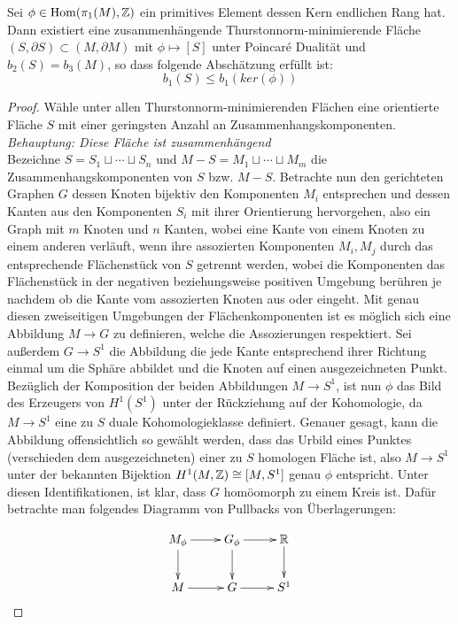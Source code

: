 \begin{lem}
	\label{lem:minS}
	Sei $\phi \in \operatorname{Hom} (\pi_1(M),\mathbb{Z})$ ein primitives Element dessen Kern endlichen Rang hat. Dann existiert eine zusammenhängende Thurstonnorm-minimierende Fläche $(S,\partial S) \subset (M,\partial M)$ mit $\phi \mapsto [S]$ unter Poincaré Dualität und $b_2(S)=b_3(M)$, so dass folgende Abschätzung erfüllt ist:
	\[
	b_1(S) \leq b_1(ker(\phi))
	\]
\end{lem}
\begin{proof}
	Wähle unter allen Thurstonnorm-minimierenden Flächen eine orientierte Fläche $S$ mit einer geringsten Anzahl an Zusammenhangskomponenten.\\
	\textit{Behauptung: Diese Fläche ist zusammenhängend}\\
	Bezeichne $S=S_1\sqcup \cdots \sqcup S_n$ und $M-S = M_1 \sqcup \cdots \sqcup M_m$ die Zusammenhangskomponenten von $S$ bzw. $M-S$. Betrachte nun den gerichteten Graphen $G$ dessen Knoten bijektiv den Komponenten $M_i$ entsprechen und dessen Kanten aus den Komponenten $S_i$ mit ihrer Orientierung hervorgehen, also ein Graph mit $m$ Knoten und $n$ Kanten, wobei eine Kante von einem Knoten zu einem anderen verläuft, wenn ihre assozierten Komponenten $M_i, M_j$ durch das entsprechende Flächenstück von $S$ getrennt werden, wobei die Komponenten das Flächenstück in der negativen beziehungsweise positiven Umgebung berühren je nachdem ob die Kante vom assozierten Knoten aus oder eingeht. Mit genau diesen zweiseitigen Umgebungen der Flächenkomponenten ist es möglich sich eine Abbildung $M \to G$ zu definieren, welche die Assozierungen respektiert. Sei außerdem $G \to S^1$ die Abbildung die jede Kante entsprechend ihrer Richtung einmal um die Sphäre abbildet und die Knoten auf einen ausgezeichneten Punkt. Bezüglich der Komposition der beiden Abbildungen $M \to S^1$, ist nun $\phi$ das Bild des Erzeugers von $H^1(S^1)$ unter der Rückziehung auf der Kohomologie, da $M \to S^1$ eine zu $S$ duale Kohomologieklasse definiert. Genauer gesagt, kann die Abbildung offensichtlich so gewählt werden, dass das Urbild eines Punktes (verschieden dem ausgezeichneten) einer zu $S$ homologen Fläche ist, also $M \to S^1$ unter der bekannten Bijektion $H^1(M,\mathbb{Z}) \cong [M,S^1]$ genau $\phi$ entspricht. Unter diesen Identifikationen, ist klar, dass $G$ homöomorph zu einem Kreis ist. Dafür betrachte man folgendes Diagramm von Pullbacks von Überlagerungen:

	\[
	 	\begin{xy}
	 		\xymatrix{
	 			M_\phi \ar[r] \ar[d] & G_\phi \ar[d] \ar[r] & \RR \ar[d]\\
	 			M \ar[r] & G \ar[r] &S^1
	 		}
	 	\end{xy}
	 \] 


\end{proof}
